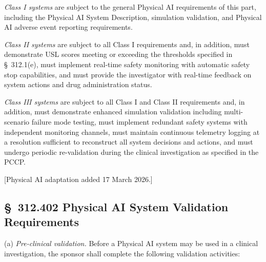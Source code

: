 \documentclass[11pt]{article}
\begin{document}
\begin{description}[leftmargin=0.8cm,style=sameline]
\item[(1)] \textit{Class I systems} are subject to the general Physical AI requirements of this part, including the Physical AI System Description, simulation validation, and Physical AI adverse event reporting requirements.
\item[(2)] \textit{Class II systems} are subject to all Class I requirements and, in addition, must demonstrate USL scores meeting or exceeding the thresholds specified in \S~312.1(e), must implement real-time safety monitoring with automatic safety stop capabilities, and must provide the investigator with real-time feedback on system actions and drug administration status.
\item[(3)] \textit{Class III systems} are subject to all Class I and Class II requirements and, in addition, must demonstrate enhanced simulation validation including multi-scenario failure mode testing, must implement redundant safety systems with independent monitoring channels, must maintain continuous telemetry logging at a resolution sufficient to reconstruct all system decisions and actions, and must undergo periodic re-validation during the clinical investigation as specified in the PCCP.
\end{description}

[Physical AI adaptation added 17 March 2026.]

\subsection{\S~312.402 Physical AI System Validation Requirements}

(a) \textit{Pre-clinical validation.} Before a Physical AI system may be used in a clinical investigation, the sponsor shall complete the following validation activities:
\end{document}
